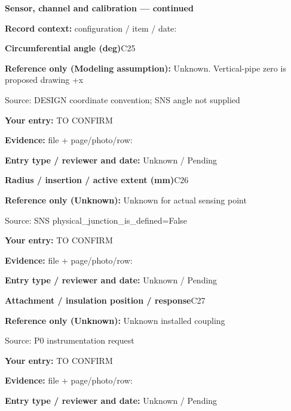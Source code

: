 \documentclass[11pt]{article}
\begin{document}
\clearpage
{\large\bfseries Sensor, channel and calibration --- continued}\par
\textbf{Record context:} configuration / item / date: \hrulefill\par
\par\noindent\begin{minipage}{\textwidth}\small
{\color{navy}\bfseries Circumferential angle (deg)}\hfill C25\par
\colorbox{pale}{\parbox{\dimexpr\linewidth-2\fboxsep\relax}{
\textbf{Reference only (Modeling assumption):} Unknown. Vertical-pipe zero is proposed drawing +x\par
{\footnotesize Source: DESIGN coordinate convention; SNS angle not supplied}}}\par
\textbf{Your entry:} {\color{muted}TO CONFIRM}\enspace\hrulefill\par
{\footnotesize\textbf{Evidence:} file + page/photo/row: \hrulefill\par
\textbf{Entry type / reviewer and date:} Unknown / Pending\par
}\end{minipage}\par\vspace{5pt}
\par\noindent\begin{minipage}{\textwidth}\small
{\color{navy}\bfseries Radius / insertion / active extent (mm)}\hfill C26\par
\colorbox{pale}{\parbox{\dimexpr\linewidth-2\fboxsep\relax}{
\textbf{Reference only (Unknown):} Unknown for actual sensing point\par
{\footnotesize Source: SNS physical\_\allowbreak{}junction\_\allowbreak{}is\_\allowbreak{}defined=False}}}\par
\textbf{Your entry:} {\color{muted}TO CONFIRM}\enspace\hrulefill\par
{\footnotesize\textbf{Evidence:} file + page/photo/row: \hrulefill\par
\textbf{Entry type / reviewer and date:} Unknown / Pending\par
}\end{minipage}\par\vspace{5pt}
\par\noindent\begin{minipage}{\textwidth}\small
{\color{navy}\bfseries Attachment / insulation position / response}\hfill C27\par
\colorbox{pale}{\parbox{\dimexpr\linewidth-2\fboxsep\relax}{
\textbf{Reference only (Unknown):} Unknown installed coupling\par
{\footnotesize Source: P0 instrumentation request}}}\par
\textbf{Your entry:} {\color{muted}TO CONFIRM}\enspace\hrulefill\par
{\footnotesize\textbf{Evidence:} file + page/photo/row: \hrulefill\par
\textbf{Entry type / reviewer and date:} Unknown / Pending\par
}\end{minipage}\par\vspace{5pt}
\end{document}
